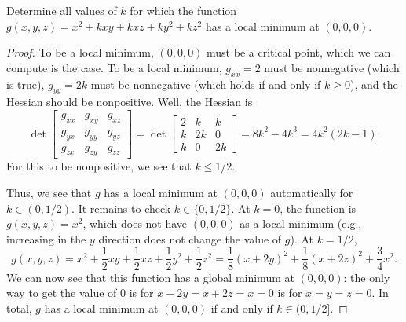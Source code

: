 \documentclass[openany]{book}
\begin{document}
\begin{prob}[24]
    Determine all values of \( k \) for which the function \( g(x, y, z) = x^2 + kxy + kxz + ky^2 + kz^2 \) has a local minimum at \( (0, 0, 0) \).
\end{prob}
\begin{proof}
    To be a local minimum, $(0,0,0)$ must be a critical point, which we can compute is the case. To be a local minimum, $g_{xx}=2$ must be nonnegative (which is true), $g_{yy}=2k$ must be nonnegative (which holds if and only if $k\ge0$), and the Hessian should be nonpositive. Well, the Hessian is
    \[\det\begin{bmatrix}
        g_{xx} & g_{xy} & g_{xz} \\
        g_{yx} & g_{yy} & g_{yz} \\
        g_{zx} & g_{zy} & g_{zz}
    \end{bmatrix}=\det\begin{bmatrix}
        2 & k & k \\
        k & 2k & 0 \\
        k & 0 & 2k
    \end{bmatrix}=8k^2-4k^3=4k^2\left(2k-1\right).\]
    For this to be nonpositive, we see that $k\le1/2$.

    Thus, we see that $g$ has a local minimum at $(0,0,0)$ automatically for $k\in(0,1/2)$. It remains to check $k\in\{0,1/2\}$. At $k=0$, the function is $g(x,y,z)=x^2$, which does not have $(0,0,0)$ as a local minimum (e.g., increasing in the $y$ direction does not change the value of $g$). At $k=1/2$,
    \[g(x,y,z)=x^2+\frac12xy+\frac12xz+\frac12y^2+\frac12z^2=\frac18(x+2y)^2+\frac18(x+2z)^2+\frac34x^2.\]
    We can now see that this function has a global minimum at $(0,0,0)$: the only way to get the value of $0$ is for $x+2y=x+2z=x=0$ is for $x=y=z=0$. In total, $g$ has a local minimum at $(0,0,0)$ if and only if $k\in(0,1/2]$.
\end{proof}
\end{document}

